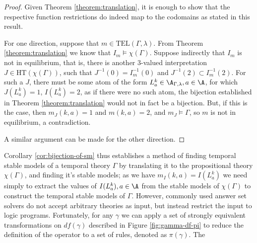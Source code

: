 \begin{proof}
  Given Theorem \ref{theorem:translation}, it is enough to show that
  the respective function restrictions do indeed map to the codomains
  as stated in this result.

  For one direction, suppose that $m \in
  \text{TEL}(\Gamma,\lambda)$. From Theorem \ref{theorem:translation}
  we know that $I_m \models \chi(\Gamma)$. Suppose indirectly that
  $I_m$ is not in equilibrium, that is, there is another 3-valued
  interpretation $J \in \text{HT}(\chi(\Gamma))$, such that
  $J^{-1}(0) = I_m^{-1}(0)$ and $J^{-1}(2) \subset I_m^{-1}(2)$. For
  such a $J$, there must be some atom of the form
  $L_{a}^k \in \A_{\Gamma,\lambda}, a \in \A$, for which
  $J(L_{a}^k)=1$, $I(L_a^k)=2$, as if there were no such atom, the
  bijection established in Theorem \ref{theorem:translation} would not
  in fact be a bijection. But, if this is the case, then
  $m_J(k,a) = 1$ and $m(k,a) = 2$, and $m_J \models \Gamma$, so $m$ is
  not in equilibrium, a contradiction.

  A similar argument can be made for the other direction.
\end{proof}

Corollary \ref{cor:bijection-of-sm} thus establishes a method of
finding temporal stable models of a temporal theory $\Gamma$ by
translating it to the propositional theory $\chi(\Gamma)$, and finding
it's stable models; as we have $m_I(k,a)=I(L_a^k)$ we need simply to
extract the values of $I(L_a^k), a\in \A$ from the stable models of
$\chi(\Gamma)$ to construct the temporal stable models of
$\Gamma$. However, commonly used answer set solvers do not accept
arbitrary theories as input, but instead restrict the input to logic
programs. Fortunately, for any $\gamma$ we can apply a set of strongly
equivalent transformations on $df(\gamma)$ described in Figure
\ref{fig:gamma-df-pi} to reduce the definition of the operator to a
set of rules, denoted as $\pi(\gamma)$. The

